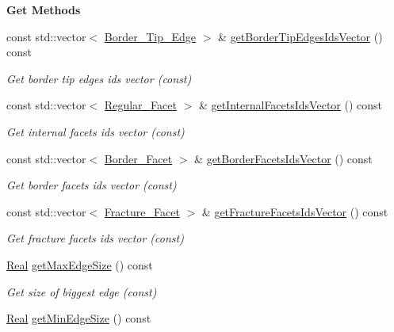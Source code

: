 \begin{Indent}{\bf Get Methods}
\begin{DoxyCompactItemize}
const std\+::vector$<$ \hyperlink{classFVCode3D_1_1Rigid__Mesh_1_1Border__Tip__Edge}{Border\+\_\+\+Tip\+\_\+\+Edge} $>$ \& \hyperlink{classFVCode3D_1_1Rigid__Mesh_a12c92b683cfb3d9ac2645f038a8c6220}{get\+Border\+Tip\+Edges\+Ids\+Vector} () const 
\begin{DoxyCompactList}\small\item\em Get border tip edges ids vector (const) \end{DoxyCompactList}\item 
const std\+::vector$<$ \hyperlink{classFVCode3D_1_1Rigid__Mesh_1_1Regular__Facet}{Regular\+\_\+\+Facet} $>$ \& \hyperlink{classFVCode3D_1_1Rigid__Mesh_a838ebf69155c115c2646d1a20b0ad249}{get\+Internal\+Facets\+Ids\+Vector} () const 
\begin{DoxyCompactList}\small\item\em Get internal facets ids vector (const) \end{DoxyCompactList}\item 
const std\+::vector$<$ \hyperlink{classFVCode3D_1_1Rigid__Mesh_1_1Border__Facet}{Border\+\_\+\+Facet} $>$ \& \hyperlink{classFVCode3D_1_1Rigid__Mesh_aa72b7fad937f0d1586fc10b176ef5d3e}{get\+Border\+Facets\+Ids\+Vector} () const 
\begin{DoxyCompactList}\small\item\em Get border facets ids vector (const) \end{DoxyCompactList}\item 
const std\+::vector$<$ \hyperlink{classFVCode3D_1_1Rigid__Mesh_1_1Fracture__Facet}{Fracture\+\_\+\+Facet} $>$ \& \hyperlink{classFVCode3D_1_1Rigid__Mesh_aadbe6d9ad704122537903396d91238e0}{get\+Fracture\+Facets\+Ids\+Vector} () const 
\begin{DoxyCompactList}\small\item\em Get fracture facets ids vector (const) \end{DoxyCompactList}\item 
\hyperlink{namespaceFVCode3D_a40c1f5588a248569d80aa5f867080e83}{Real} \hyperlink{classFVCode3D_1_1Rigid__Mesh_a03fd4643756039db62f827e2ad94cdaf}{get\+Max\+Edge\+Size} () const 
\begin{DoxyCompactList}\small\item\em Get size of biggest edge (const) \end{DoxyCompactList}\item 
\hyperlink{namespaceFVCode3D_a40c1f5588a248569d80aa5f867080e83}{Real} \hyperlink{classFVCode3D_1_1Rigid__Mesh_aa814be4bc0f5471c92524a8fce5028f3}{get\+Min\+Edge\+Size} () const 

\end{DoxyCompactItemize}
\end{Indent}
